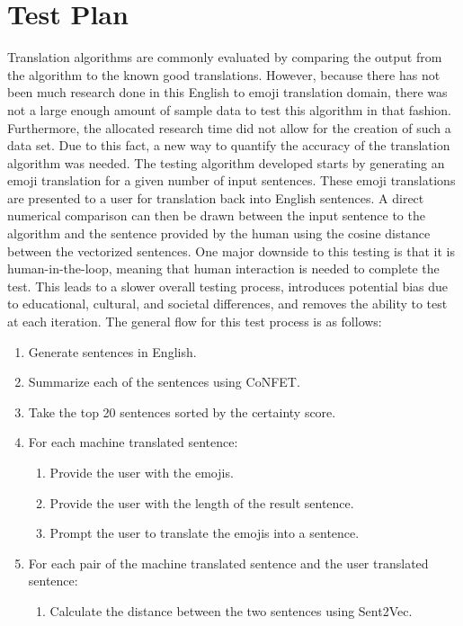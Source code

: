 \documentclass{article}[10]
\begin{document}
\section{Test Plan\label{sec:testPlan}}

Translation algorithms are commonly evaluated by comparing the output from the
algorithm to the known good translations. However, because there has not been
much research done in this English to emoji translation domain, there was not a
large enough amount of sample data to test this algorithm in that fashion.
Furthermore, the allocated research time did not allow for the creation of such
a data set. Due to this fact, a new way to quantify the accuracy of the
translation algorithm was needed. The testing algorithm developed starts by
generating an emoji translation for a given number of input sentences. These
emoji translations are presented to a user for translation back into English
sentences. A direct numerical comparison can then be drawn between the input
sentence to the algorithm and the sentence provided by the human using the
cosine distance between the vectorized sentences. One major downside to this
testing is that it is human-in-the-loop, meaning that human interaction is
needed to complete the test. This leads to a slower overall testing process,
introduces potential bias due to educational, cultural, and societal
differences, and removes the ability to test at each iteration. The general flow
for this test process is as follows:

\begin{enumerate}[label= (\arabic*)]
  \itemsep0em
  \item Generate sentences in English.
  \item Summarize each of the sentences using CoNFET\@.
  \item Take the top 20 sentences sorted by the certainty score.
  \item For each machine translated sentence:
    \begin{enumerate}[topsep=0pt]
      \itemsep0em
      \item Provide the user with the emojis.
      \item Provide the user with the length of the result sentence.
      \item Prompt the user to translate the emojis into a sentence.
    \end{enumerate}
  \item For each pair of the machine translated sentence and the user translated
    sentence:
    \begin{enumerate}[topsep=0pt]
      \itemsep0em
      \item Calculate the distance between the two sentences using Sent2Vec.
    \end{enumerate}
\end{enumerate}
\end{document}
